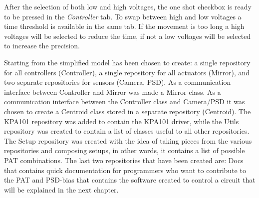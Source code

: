 After the selection of both low and high voltages, the one shot checkbox is ready to be pressed in the \emph{Controller} tab. To
swap between high and low voltages a time threshold is available in the same tab. If the movement is too long a high voltages will be selected to reduce the time, if not a low voltages will be selected to increase the precision.

Starting from the simplified model  has been chosen to create: a single repository for all controllers (Controller), a single repository for all actuators (Mirror), and two separate repositories for sensors (Camera, PSD).
As a communication interface between Controller and Mirror was made a Mirror class. As a communication interface between the Controller class and Camera/PSD it was chosen to create a Centroid class stored in a separate repository (Centroid).
The KPA101 repository was added to contain the KPA101 driver, while the Utils repository was created to contain a list of classes useful to all other repositories.
The Setup repository was created with the idea of taking pieces from the various repositories and composing setups, in other words, it contains a list of possible PAT combinations.
The last two repositories that have been created are: Docs that contains quick documentation for programmers who want to contribute to the PAT and PSD-bias that contains the software created to control a circuit that will be explained in the next chapter.








